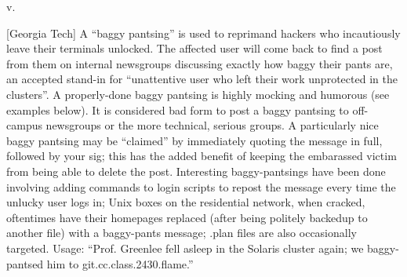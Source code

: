  v.

[Georgia Tech] A ``baggy pantsing'' is used to reprimand hackers who
incautiously leave their terminals unlocked. The affected user will come back to
find a post from them on internal newsgroups discussing exactly how baggy their
pants are, an accepted stand-in for ``unattentive user who left their work
unprotected in the clusters''. A properly-done baggy pantsing is highly mocking
and humorous (see examples below). It is considered bad form to post a baggy
pantsing to off-campus newsgroups or the more technical, serious groups. A
particularly nice baggy pantsing may be ``claimed'' by immediately quoting the
message in full, followed by your sig; this has the added benefit of keeping the
embarassed victim from being able to delete the post. Interesting
baggy-pantsings have been done involving adding commands to login scripts to
repost the message every time the unlucky user logs in; Unix boxes on the
residential network, when cracked, oftentimes have their homepages replaced
(after being politely backedup to another file) with a baggy-pants message;
.plan files are also occasionally targeted. Usage: ``Prof. Greenlee fell asleep
in the Solaris cluster again; we baggy-pantsed him to git.cc.class.2430.flame.''

